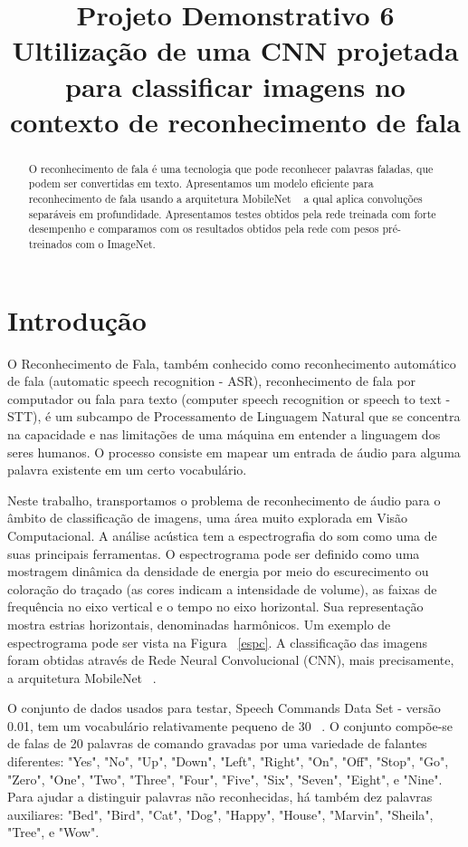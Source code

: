 \documentclass{bmvc2k}
\title{Projeto Demonstrativo 6\\ Ultilização de uma CNN projetada para classificar imagens no contexto de reconhecimento de fala}
\begin{document}
\maketitle

\begin{abstract}

O reconhecimento de fala é uma tecnologia que pode reconhecer palavras faladas, que podem ser convertidas em texto. Apresentamos um modelo eficiente para reconhecimento de fala usando a arquitetura MobileNet ~\cite{mobilenets} a qual aplica convoluções separáveis em profundidade. Apresentamos testes obtidos pela rede treinada com forte desempenho e comparamos com os resultados obtidos pela rede com pesos pré-treinados com o ImageNet.

\end{abstract}

\section{Introdução}
\label{sec:intro}

O Reconhecimento de Fala, também conhecido como reconhecimento automático de fala (automatic speech recognition - ASR), reconhecimento de fala por computador ou fala para texto (computer speech recognition or speech to text - STT), é um subcampo de Processamento de Linguagem Natural que se concentra na capacidade e nas limitações de uma máquina em entender a linguagem dos seres humanos. O processo consiste em mapear um entrada de áudio para alguma palavra existente em um certo vocabulário. 

Neste trabalho, transportamos o problema de reconhecimento de áudio para o âmbito de classificação de imagens, uma área muito explorada em Visão Computacional. A análise acústica tem a espectrografia do som como uma de suas principais ferramentas. O espectrograma pode ser definido como uma mostragem dinâmica da densidade de energia por meio do escurecimento ou coloração do traçado (as cores indicam a intensidade de volume), as faixas de frequência no eixo vertical e o tempo no eixo horizontal. Sua representação mostra estrias horizontais, denominadas harmônicos. Um exemplo de espectrograma pode ser vista na Figura ~\ref{espc}. A classificação das imagens foram obtidas através de Rede Neural Convolucional (CNN), mais precisamente, a arquitetura MobileNet ~\cite{mobilenets}.

O conjunto de dados usados para testar, Speech Commands Data Set - versão 0.01, tem um vocabulário relativamente pequeno de 30 ~\cite{speechcommandsv2}. O conjunto compõe-se de falas de 20 palavras de comando gravadas por uma variedade de falantes diferentes:  "Yes", "No", "Up", "Down", "Left", "Right", "On", "Off", "Stop", "Go", "Zero", "One", "Two", "Three", "Four", "Five", "Six", "Seven", "Eight", e "Nine". Para ajudar a distinguir palavras não reconhecidas, há também dez palavras auxiliares:  "Bed", "Bird", "Cat", "Dog", "Happy", "House", "Marvin", "Sheila", "Tree", e "Wow".
\end{document}
